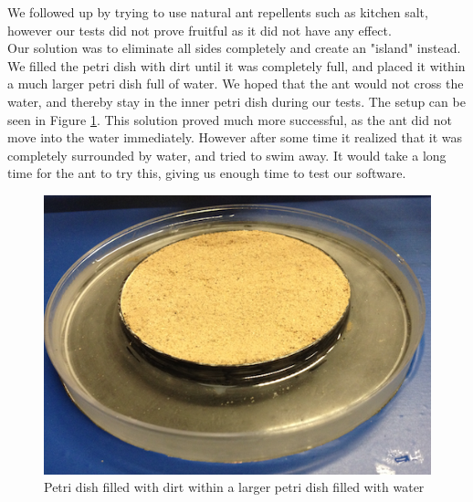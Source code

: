 We followed up by trying to use natural ant repellents such as kitchen salt, however our tests did not prove fruitful as it did not have any effect.\\

Our solution was to eliminate all sides completely and create an "island" instead. We filled the petri dish with dirt until it was completely full, and placed it within a much larger petri dish full of water. We hoped that the ant would not cross the water, and thereby stay in the inner petri dish during our tests. The setup can be seen in Figure \ref{fig:petridish}. This solution proved much more successful, as the ant did not move into the water immediately. However after some time it realized that it was completely surrounded by water, and tried to swim away. It would take a long time for the ant to try this, giving us enough time to test our software.\\

\begin{figure}[ht!]
  \centering
    \includegraphics[scale=0.25]{img/petridish}
  \caption{Petri dish filled with dirt within a larger petri dish filled with water}
  \label{fig:petridish}
\end{figure}